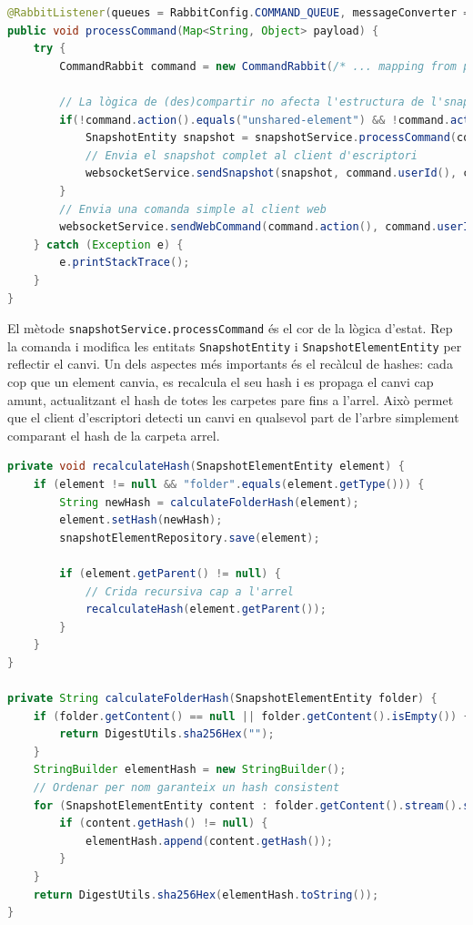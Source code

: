 \begin{lstlisting}[language=Java, caption={Listener de RabbitMQ per processar comandes a `Receiver`}]
@RabbitListener(queues = RabbitConfig.COMMAND_QUEUE, messageConverter = "jackson2JsonMessageConverter")
public void processCommand(Map<String, Object> payload) {
    try {
        CommandRabbit command = new CommandRabbit(/* ... mapping from payload ... */);
        
        // La lògica de (des)compartir no afecta l'estructura de l'snapshot directament
        if(!command.action().equals("unshared-element") && !command.action().equals("shared-element")) {
            SnapshotEntity snapshot = snapshotService.processCommand(command);
            // Envia el snapshot complet al client d'escriptori
            websocketService.sendSnapshot(snapshot, command.userId(), command.connectionId());
        }
        // Envia una comanda simple al client web
        websocketService.sendWebCommand(command.action(), command.userId(), command.connectionId(), command.elementId(), command.parentId());
    } catch (Exception e) {
        e.printStackTrace();
    }
}
\end{lstlisting}

El mètode \texttt{snapshotService.processCommand} és el cor de la lògica d'estat. Rep la comanda i modifica les entitats \texttt{SnapshotEntity} i \texttt{SnapshotElementEntity} per reflectir el canvi. Un dels aspectes més importants és el recàlcul de hashes: cada cop que un element canvia, es recalcula el seu hash i es propaga el canvi cap amunt, actualitzant el hash de totes les carpetes pare fins a l'arrel. Això permet que el client d'escriptori detecti un canvi en qualsevol part de l'arbre simplement comparant el hash de la carpeta arrel.

\begin{lstlisting}[language=Java, caption={Recàlcul recursiu de hashes a `SnapshotService`}]
private void recalculateHash(SnapshotElementEntity element) {
    if (element != null && "folder".equals(element.getType())) {
        String newHash = calculateFolderHash(element);
        element.setHash(newHash);
        snapshotElementRepository.save(element);
        
        if (element.getParent() != null) {
            // Crida recursiva cap a l'arrel
            recalculateHash(element.getParent());
        }
    }
}

private String calculateFolderHash(SnapshotElementEntity folder) {
    if (folder.getContent() == null || folder.getContent().isEmpty()) {
        return DigestUtils.sha256Hex("");
    }
    StringBuilder elementHash = new StringBuilder();
    // Ordenar per nom garanteix un hash consistent
    for (SnapshotElementEntity content : folder.getContent().stream().sorted(Comparator.comparing(SnapshotElementEntity::getName)).toList()) {
        if (content.getHash() != null) {
            elementHash.append(content.getHash());
        }
    }
    return DigestUtils.sha256Hex(elementHash.toString());
}
\end{lstlisting}

